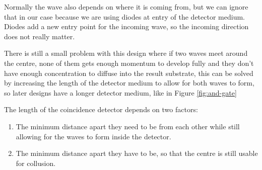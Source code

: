 Normally the wave also depends on where it is coming from, but we can ignore that in our case because we are using diodes at entry of the detector medium. Diodes add a new entry point for the incoming wave, so the incoming direction does not really matter. 

There is still a small problem with this design where if two waves meet around the centre, none of them gets enough momentum to develop fully and they don't have enough concentration to diffuse into the result substrate, this can be solved by increasing the length of the detector medium to allow for both waves to form, so later designs have a longer detector medium, like in Figure \ref{fig:and-gate}

The length of the coincidence detector depends on two factors:
\begin{enumerate}
    \item The minimum distance apart they need to be from each other while still allowing for the waves to form inside the detector.
    \item The minimum distance apart they have to be, so that the centre is still usable for collusion.
\end{enumerate}